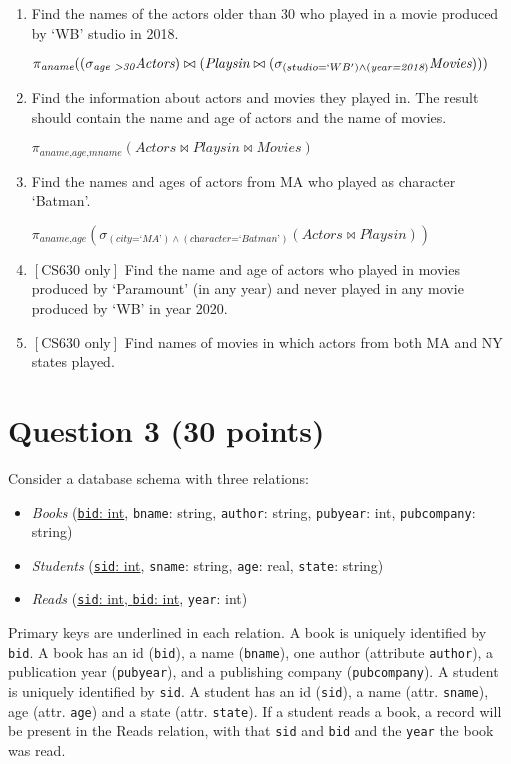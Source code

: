 \documentclass[letterpaper, 11pt]{article}
\begin{document}
\begin{enumerate}[label={\alph*})]
    \item Find the names of the actors older than 30 who played in a movie produced by `WB' studio in 2018.

    $\pi_{\textit{aname}}((\sigma_{\textit{age \textgreater 30}}\textit{Actors}) \bowtie (\textit{Playsin} \bowtie (\sigma_{(studio=`WB') \wedge (\textit{year=2018})}\textit{Movies})))$
    
    \item Find the information about actors and movies they played in. The result should contain the name and age of actors and the name of movies.

    $\pi_{\textit{aname,age,mname}}(\textit{Actors} \bowtie \textit{Playsin} \bowtie \textit{Movies})$
    
    \item Find the names and ages of actors from MA who played as character `Batman'.

    $\pi_{\textit{aname,age}}(\sigma_{(\textit{city=`MA'})\wedge (\textit{character=`Batman'})}(\textit{Actors} \bowtie \textit{Playsin}))$
    
    \item $\left[\text{CS630 only}\right]$ Find the name and age of actors who played in movies produced by `Paramount' (in any year) and never played in any movie produced by `WB' in year 2020.
    \item $\left[\text{CS630 only}\right]$ Find names of movies in which actors from both MA and NY states played.
\end{enumerate}

\section*{Question 3 (30 points)}

Consider a database schema with three relations:
\begin{itemize}
    \item \textit{Books} (\ul{\texttt{bid}: int}, \texttt{bname}: string, \texttt{author}: string, \texttt{pubyear}: int, \texttt{pubcompany}: string)
    \item \textit{Students} (\ul{\texttt{sid}: int}, \texttt{sname}: string, \texttt{age}: real, \texttt{state}: string)
    \item \textit{Reads} (\ul{\texttt{sid}: int, \texttt{bid}: int}, \texttt{year}: int)
\end{itemize}

Primary keys are underlined  in each relation. A book is uniquely identified by \texttt{bid}. A book has an id (\texttt{bid}), a name (\texttt{bname}), one author (attribute \texttt{author}), a publication year (\texttt{pubyear}), and a publishing company (\texttt{pubcompany}). A student is uniquely identified by \texttt{sid}. A student has an id (\texttt{sid}), a name (attr. \texttt{sname}), age (attr. \texttt{age}) and a state (attr. \texttt{state}). If a student reads a book, a record will be present in the Reads relation, with that \texttt{sid} and \texttt{bid} and the \texttt{year} the book was read.
\end{document}
